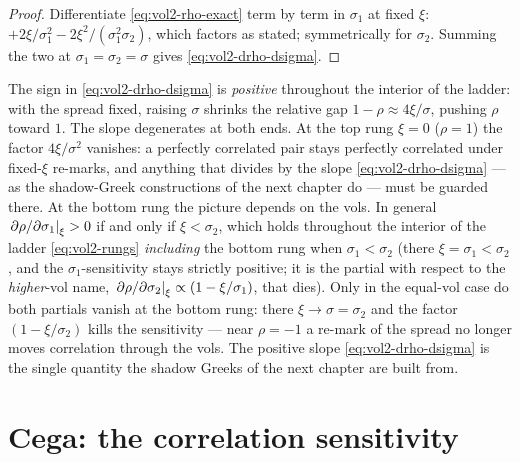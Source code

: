\begin{proof}
Differentiate \eqref{eq:vol2-rho-exact} term by term in $\sigma_1$ at fixed
$\xi$: $+2\xi/\sigma_1^2 - 2\xi^2/(\sigma_1^2\sigma_2)$, which factors as
stated; symmetrically for $\sigma_2$. Summing the two at
$\sigma_1 = \sigma_2 = \sigma$ gives \eqref{eq:vol2-drho-dsigma}.
\end{proof}

\begin{remark}
\label{rem:vol2-sign}
The sign in \eqref{eq:vol2-drho-dsigma} is \emph{positive} throughout the
interior of the ladder: with the spread fixed, raising $\sigma$ shrinks the
relative gap $1-\rho \approx 4\xi/\sigma$, pushing $\rho$ toward $1$. The
slope degenerates at both ends. At the top rung $\xi = 0$ ($\rho = 1$) the
factor $4\xi/\sigma^2$ vanishes: a perfectly correlated pair stays
perfectly correlated under fixed-$\xi$ re-marks, and anything that divides
by the slope \eqref{eq:vol2-drho-dsigma} --- as the shadow-Greek
constructions of the next chapter do --- must be guarded there. At the
bottom rung the picture depends on the vols. In general
$\left.\partial\rho/\partial\sigma_1\right|_{\xi} > 0$ if and only if
$\xi < \sigma_2$, which holds throughout the interior of the ladder
\eqref{eq:vol2-rungs} \emph{including} the bottom rung when
$\sigma_1 < \sigma_2$ (there $\xi = \sigma_1 < \sigma_2$, and the
$\sigma_1$-sensitivity stays strictly positive; it is the partial with
respect to the \emph{higher}-vol name, $\left.\partial\rho/\partial
\sigma_2\right|_{\xi} \propto (1 - \xi/\sigma_1)$, that dies). Only in the
equal-vol case do both partials vanish at the bottom rung: there
$\xi \to \sigma = \sigma_2$ and the factor $(1 - \xi/\sigma_2)$ kills the
sensitivity --- near $\rho = -1$ a re-mark of the spread no longer moves
correlation through the vols. The positive slope
\eqref{eq:vol2-drho-dsigma} is the single quantity the shadow Greeks of the
next chapter are built from.
\end{remark}

\section{Cega: the correlation sensitivity}
\label{sec:vol2-cega}

